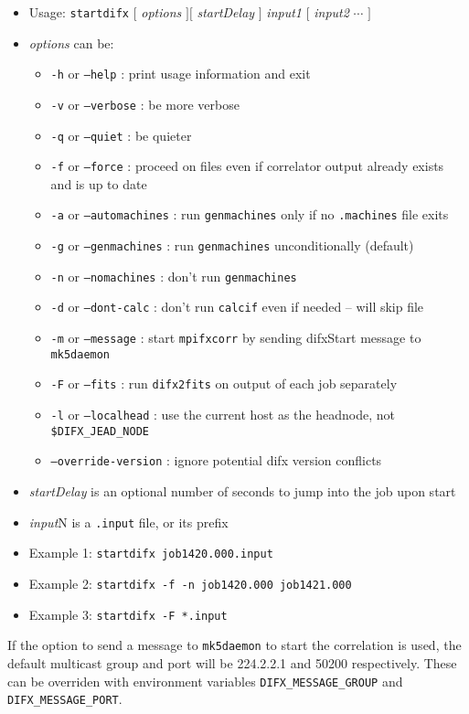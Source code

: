 \begin{itemize}
\item[] Usage: {\tt startdifx} $[$ {\em options} $] [$ {\em startDelay} $]$ {\em input1} $[$ {\em input2} $\cdots$ $]$
\item[] {\em options} can be:
\begin{itemize}
\item[] {\tt -h} or {\tt --help} : print usage information and exit
\item[] {\tt -v} or {\tt --verbose} : be more verbose
\item[] {\tt -q} or {\tt --quiet} : be quieter
\item[] {\tt -f} or {\tt --force} : proceed on files even if correlator output already exists and is up to date
\item[] {\tt -a} or {\tt --automachines} : run {\tt genmachines} only if no {\tt .machines} file exits
\item[] {\tt -g} or {\tt --genmachines} : run {\tt genmachines} unconditionally (default)
\item[] {\tt -n} or {\tt --nomachines} : don't run {\tt genmachines}
\item[] {\tt -d} or {\tt --dont-calc} : don't run {\tt calcif} even if needed -- will skip file
\item[] {\tt -m} or {\tt --message} : start {\tt mpifxcorr} by sending {difxStart} message to {\tt mk5daemon}
\item[] {\tt -F} or {\tt --fits} : run {\tt difx2fits} on output of each job separately
\item[] {\tt -l} or {\tt --localhead} : use the current host as the headnode, not {\tt \$DIFX\_JEAD\_NODE}
\item[] {\tt --override-version} : ignore potential difx version conflicts
\end{itemize} 
\item[] {\em startDelay} is an optional number of seconds to jump into the job upon start
\item[] {\em input}N is a {\tt .input} file, or its prefix
\item[] Example 1: {\tt startdifx job1420.000.input}
\item[] Example 2: {\tt startdifx -f -n job1420.000 job1421.000}
\item[] Example 3: {\tt startdifx -F *.input}
\end{itemize}

If the option to send a message to {\tt mk5daemon} to start the correlation is used, the default multicast group and port will be 224.2.2.1 and 50200 respectively.
These can be overriden with environment variables {\tt DIFX\_MESSAGE\_GROUP} and {\tt DIFX\_MESSAGE\_PORT}.






